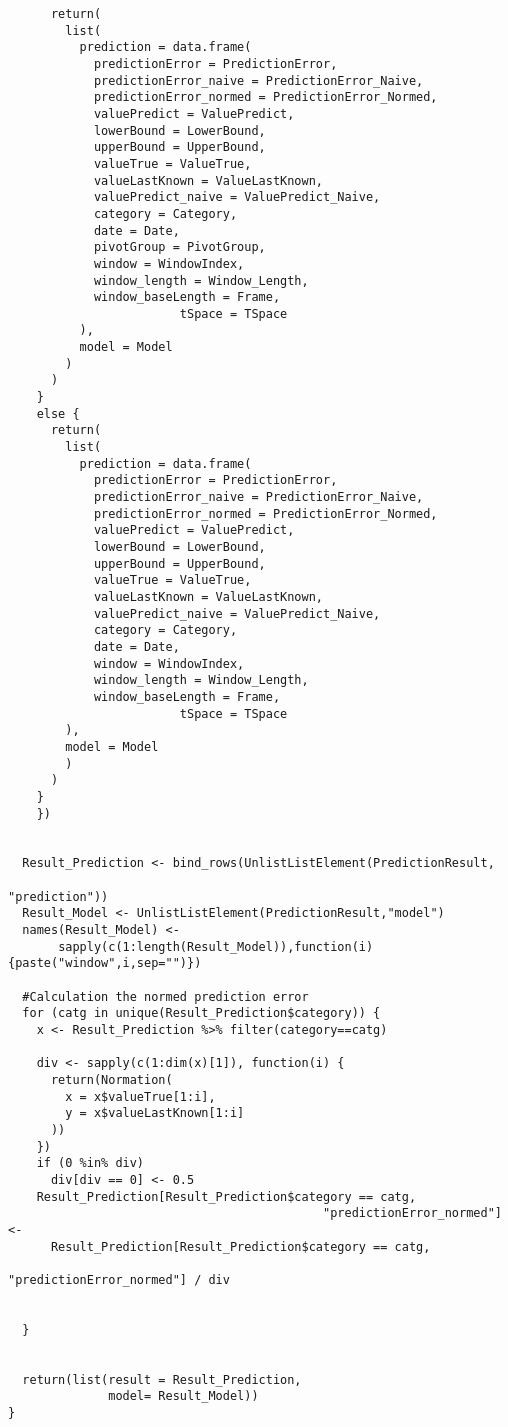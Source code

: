 \begin{verbatim}
      return(
        list(
          prediction = data.frame(
            predictionError = PredictionError,
            predictionError_naive = PredictionError_Naive,
            predictionError_normed = PredictionError_Normed,
            valuePredict = ValuePredict,
            lowerBound = LowerBound,
            upperBound = UpperBound,
            valueTrue = ValueTrue,
            valueLastKnown = ValueLastKnown,
            valuePredict_naive = ValuePredict_Naive,
            category = Category,
            date = Date,
            pivotGroup = PivotGroup,
            window = WindowIndex,
            window_length = Window_Length,
            window_baseLength = Frame,
						tSpace = TSpace
          ),
          model = Model
        )
      )
    } 
    else {
      return(
        list(
          prediction = data.frame(
            predictionError = PredictionError,
            predictionError_naive = PredictionError_Naive,
            predictionError_normed = PredictionError_Normed,
            valuePredict = ValuePredict,
            lowerBound = LowerBound,
            upperBound = UpperBound,
            valueTrue = ValueTrue,
            valueLastKnown = ValueLastKnown,
            valuePredict_naive = ValuePredict_Naive,
            category = Category,
            date = Date,
            window = WindowIndex,
            window_length = Window_Length,
            window_baseLength = Frame,
						tSpace = TSpace
        ),
        model = Model
        )
      )
    }
    })
  
  
  Result_Prediction <- bind_rows(UnlistListElement(PredictionResult,
																									 "prediction"))
  Result_Model <- UnlistListElement(PredictionResult,"model")
  names(Result_Model) <- 
	   sapply(c(1:length(Result_Model)),function(i){paste("window",i,sep="")})
  
  #Calculation the normed prediction error
  for (catg in unique(Result_Prediction$category)) {
    x <- Result_Prediction %>% filter(category==catg)
    
    div <- sapply(c(1:dim(x)[1]), function(i) {
      return(Normation(
        x = x$valueTrue[1:i],
        y = x$valueLastKnown[1:i]
      ))
    })
    if (0 %in% div)
      div[div == 0] <- 0.5
    Result_Prediction[Result_Prediction$category == catg, 
											"predictionError_normed"] <-
      Result_Prediction[Result_Prediction$category == catg, 
												"predictionError_normed"] / div
    
    
  }
  
  
  return(list(result = Result_Prediction,
              model= Result_Model))
}
\end{verbatim}

